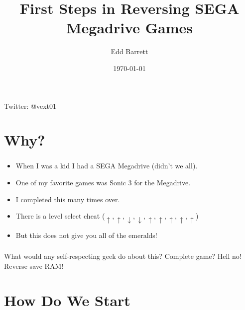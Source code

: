 \documentclass{beamer}
\title{First Steps in Reversing SEGA Megadrive Games}
\author{Edd Barrett}
\date{\today}
\begin{document}

\begin{frame}[fragile]
  \titlepage
  \vspace{-4em}
  \begin{center}
  Twitter: @vext01
  \end{center}
\end{frame}


\section{Why?}

\begin{frame}[fragile]
\frametitle{\insertsection}

\begin{itemize} 
\item When I was a kid I had a SEGA Megadrive (didn't we all).
\item One of my favorite games was Sonic 3 for the Megadrive.
\item I completed this many times over.
\item There is a level select cheat ($\uparrow, \uparrow, \downarrow, \downarrow, \uparrow, \uparrow, \uparrow, \uparrow, \uparrow$)
\item But this does not give you all of the emeralds!
\end{itemize}

\end{frame}


\begin{frame}[fragile]
\frametitle{\insertsection}

\begin{center}
\large{What would any self-respecting geek do about this?}
\vfill
\pause
\vfill
\large{Complete game?} \pause \large{Hell no!}
\vfill
\pause
\huge{Reverse save RAM!}
\end{center}

\end{frame}


\section{How Do We Start}
\end{document}
